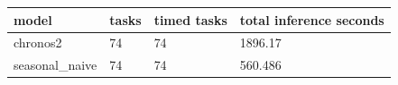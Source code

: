 \begin{tabular}{llll}
\toprule
model & tasks & timed tasks & total inference seconds \\
\midrule
chronos2 & 74 & 74 & 1896.17 \\
seasonal\_naive & 74 & 74 & 560.486 \\
\bottomrule
\end{tabular}
